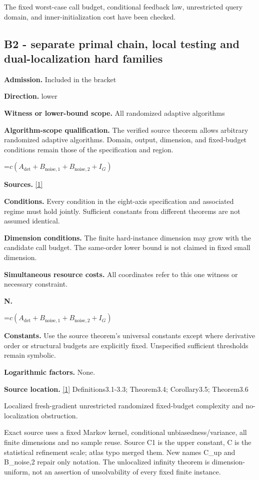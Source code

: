 \documentclass[10pt,a4paper]{article}
\newcommand{\AtlasMath}[1]{\par\begingroup\centering\setbox0=\hbox{$\displaystyle #1$}\ifdim\wd0>1.4\linewidth\typeout{ATLAS WIDE FORMULA: \the\wd0}\fi\ifdim\wd0>\linewidth\resizebox{\linewidth}{!}{\box0}\else\box0\fi\par\endgroup}
\begin{document}
The fixed worst-case call budget, conditional feedback law, unrestricted query domain, and inner-initialization cost have been checked.

\subsection{B2 - separate primal chain, local testing and dual-localization hard families}
\textbf{Admission.} Included in the bracket

\textbf{Direction.} lower

\textbf{Witness or lower-bound scope.} All randomized adaptive algorithms

\textbf{Algorithm-scope qualification.} The verified source theorem allows arbitrary randomized adaptive algorithms. Domain, output, dimension, and fixed-budget conditions remain those of the specification and region.

\AtlasMath{c(A_{\mathrm{det}}+B_{\mathrm{noise},1}+B_{\mathrm{noise},2}+I_G)}
\textbf{Sources.} \href{https://arxiv.org/pdf/2610.00229v2}{[1]}

\textbf{Conditions.} Every condition in the eight-axis specification and associated regime must hold jointly. Sufficient constants from different theorems are not assumed identical.

\textbf{Dimension conditions.} The finite hard-instance dimension may grow with the candidate call budget. The same-order lower bound is not claimed in fixed small dimension.

\textbf{Simultaneous resource costs.} All coordinates refer to this one witness or necessary constraint.

\textbf{N.}

\AtlasMath{c(A_{\mathrm{det}}+B_{\mathrm{noise},1}+B_{\mathrm{noise},2}+I_G)}
\textbf{Constants.} Use the source theorem’s universal constants except where derivative order or structural budgets are explicitly fixed. Unspecified sufficient thresholds remain symbolic.

\textbf{Logarithmic factors.} None.

\textbf{Source location.} \href{https://arxiv.org/pdf/2610.00229v2}{[1]} Definitions3.1-3.3; Theorem3.4; Corollary3.5; Theorem3.6

Localized fresh-gradient unrestricted randomized fixed-budget complexity and no-localization obstruction.

Exact source uses a fixed Markov kernel, conditional unbiasedness/variance, all finite dimensions and no sample reuse. Source C1 is the upper constant, C is the statistical refinement scale; atlas typo merged them. New names C\_up and B\_noise,2 repair only notation. The unlocalized infinity theorem is dimension-uniform, not an assertion of unsolvability of every fixed finite instance.
\end{document}
